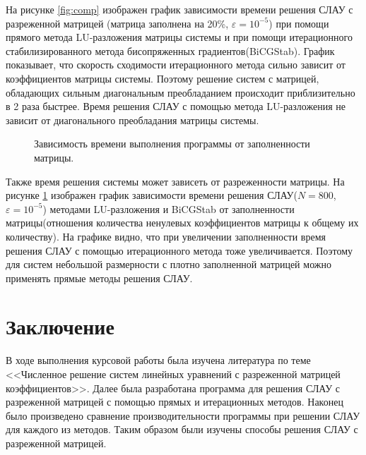 \documentclass[a4paper, fontsize=14pt]{article}
\begin{document}
На рисунке \ref{fig:comp} изображен график зависимости времени решения СЛАУ с разреженной матрицей
(матрица заполнена на 20\%, $\varepsilon = 10^{-5}$) при помощи прямого метода LU-разложения
матрицы системы и при помощи итерационного стабилизированного метода бисопряженных
градиентов(BiCGStab). График показывает, что скорость
сходимости итерационного метода сильно зависит от коэффициентов матрицы системы. Поэтому решение
систем с матрицей, обладающих сильным диагональным преобладанием происходит приблизительно в 2 раза
быстрее. Время решения СЛАУ с помощью метода LU-разложения не зависит от диагонального преобладания
матрицы системы. 

\begin{figure}[H]
    \scriptsize
    \centering
    
    \caption{Зависимость времени выполнения программы от заполненности матрицы.}
    \label{fig:fill}
\end{figure}
Также время решения системы может зависеть от разреженности матрицы. На рисунке \ref{fig:fill}
изображен график зависимости времени решения СЛАУ($N=800$, $\varepsilon = 10^{-5}$) методами LU-разложения и BiCGStab от заполненности
матрицы(отношения количества ненулевых коэффициентов матрицы к общему их количеству). На графике
видно, что при увеличении заполненности время решения СЛАУ с помощью итерационного метода тоже
увеличивается. Поэтому для систем небольшой размерности с плотно заполненной матрицей можно
применять прямые методы решения СЛАУ.

\newpage

\section*{Заключение}
В ходе выполнения курсовой работы была изучена литература по теме <<Численное решение систем
линейных уравнений с разреженной матрицей коэффициентов>>. 
Далее была разработана программа для решения СЛАУ с разреженной матрицей с помощью прямых и
итерационных методов.  Наконец было произведено сравнение производительности программы при
решении СЛАУ для каждого из методов. Таким образом были изучены способы решения СЛАУ с разреженной
матрицей.


\newpage


\printbibliography
\end{document}
